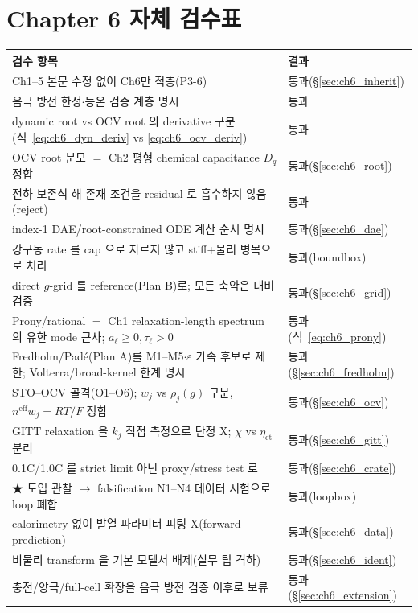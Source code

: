\documentclass[11pt,a4paper]{article}
\newcommand{\eff}{\mathrm{eff}}
\begin{document}
\section{Chapter 6 자체 검수표}\label{sec:ch6_selfcheck}
{\small
\begin{longtable}{p{} p{}}
\toprule 검수 항목 & 결과 \\ \midrule \endhead
Ch1--5 본문 수정 없이 Ch6만 적층(P3-6) & 통과(\S\ref{sec:ch6_inherit}) \\
음극 방전 한정$\cdot$등온 검증 계층 명시 & 통과 \\
dynamic root vs OCV root 의 derivative 구분(식~\eqref{eq:ch6_dyn_deriv} vs \eqref{eq:ch6_ocv_deriv}) & 통과 \\
OCV root 분모 $=$ Ch2 평형 chemical capacitance $D_q$ 정합 & 통과(\S\ref{sec:ch6_root}) \\
전하 보존식 해 존재 조건을 residual 로 흡수하지 않음(reject) & 통과 \\
index-1 DAE/root-constrained ODE 계산 순서 명시 & 통과(\S\ref{sec:ch6_dae}) \\
강구동 rate 를 cap 으로 자르지 않고 stiff+물리 병목으로 처리 & 통과(boundbox) \\
direct $g$-grid 를 reference(Plan B)로; 모든 축약은 대비 검증 & 통과(\S\ref{sec:ch6_grid}) \\
Prony/rational $=$ Ch1 relaxation-length spectrum 의 유한 mode 근사; $a_\ell\ge0,\tau_\ell>0$ & 통과(식~\eqref{eq:ch6_prony}) \\
Fredholm/Padé(Plan A)를 M1--M5$\cdot\varepsilon$ 가속 후보로 제한; Volterra/broad-kernel 한계 명시 & 통과(\S\ref{sec:ch6_fredholm}) \\
STO--OCV 골격(O1--O6); $w_j$ vs $\rho_j(g)$ 구분, $n^{\eff}w_j=RT/F$ 정합 & 통과(\S\ref{sec:ch6_ocv}) \\
GITT relaxation 을 $k_j$ 직접 측정으로 단정 X; $\chi$ vs $\eta_{\mathrm{ct}}$ 분리 & 통과(\S\ref{sec:ch6_gitt}) \\
0.1C/1.0C 를 strict limit 아닌 proxy/stress test 로 & 통과(\S\ref{sec:ch6_crate}) \\
★ 도입 관찰 $\to$ falsification N1--N4 데이터 시험으로 loop 폐합 & 통과(loopbox) \\
calorimetry 없이 발열 파라미터 피팅 X(forward prediction) & 통과(\S\ref{sec:ch6_data}) \\
비물리 transform 을 기본 모델서 배제(실무 팁 격하) & 통과(\S\ref{sec:ch6_ident}) \\
충전/양극/full-cell 확장을 음극 방전 검증 이후로 보류 & 통과(\S\ref{sec:ch6_extension}) \\
\bottomrule
\end{longtable}
}
\end{document}
